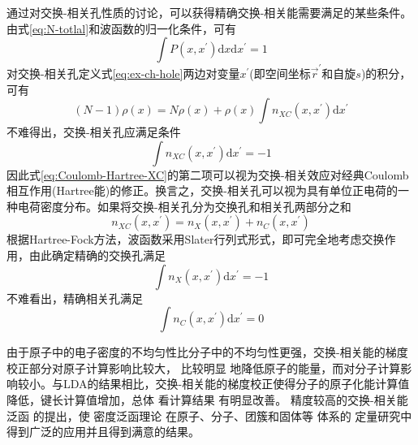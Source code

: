 通过对交换-相关孔性质的讨论，可以获得精确交换-相关能需要满足的某些条件。由式\eqref{eq:N-totlal}和波函数的归一化条件，可有
\begin{equation}
	\int P(x,x^{\prime})\mathrm{d}x\mathrm{d}x^{\prime}=1
	\label{eq:normalisation}
\end{equation}
对交换-相关孔定义式\eqref{eq:ex-ch-hole}两边对变量$x^{\prime}$(即空间坐标$\vec r^{\prime}$和自旋$s$)的积分，可有
\begin{equation}
	(N-1)\rho(x)=N\rho(x)+\rho(x)\int n_{XC}(x,x^{\prime})\mathrm{d}x^{\prime}
	\label{eq:ex-ch-hole-integrate}
\end{equation}
不难得出，交换-相关孔应满足条件
\begin{equation}
	\int n_{XC}(x,x^{\prime})\mathrm{d}x^{\prime}=-1
	\label{eq:ex-ch-hole-condition}
\end{equation}
因此式\eqref{eq:Coulomb-Hartree-XC}的第二项可以视为交换-相关效应对经典\textrm{Coulomb}相互作用(\textrm{Hartree}能)的修正。换言之，交换-相关孔可以视为具有单位正电荷的一种电荷密度分布。如果将交换-相关孔分为交换孔和相关孔两部分之和
\begin{equation}
	n_{XC}(x,x^{\prime})=n_X(x,x^{\prime})+n_C(x,x^{\prime})
	\label{eq:ex-ch-devode}
\end{equation}
根据\textrm{Hartree-Fock}方法，波函数采用\textrm{Slater}行列式形式，即可完全地考虑交换作用，由此确定精确的交换孔满足
\begin{equation}
	\int n_{X}(x,x^{\prime})\mathrm{d}x^{\prime}=-1
	\label{eq:ex-hole-condition}
\end{equation}
不难看出，精确相关孔满足
\begin{equation}
	\int n_{C}(x,x^{\prime})\mathrm{d}x^{\prime}=0
	\label{eq:ch-hole-condition}
\end{equation}

由于原子中的电子密度的不均匀性比分子中的不均匀性更强，交换-相关能的梯度校正部分对原子{计算}影响比较大，%
比较明显%
{地}降低原子的能量，而对分子{计算}影响较小{。}与LDA的结果相比，交换-相关能的梯度校正使得分子的原子化能{计算值}降低，键长{计算值}增加，总体%
{看计算}结果%
有明显改善。%
精度较高的交换-相关能泛函%
的提出，使%
密度泛函理论%
{在}原子、分子、团簇和固体等%
体系的%
{定量研究中得到广泛的应用并且得到满意的结果。}

